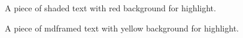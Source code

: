 \documentclass{beamer}
\begin{document}
\begin{frame}
  \begin{shaded}
    A piece of shaded text with red background for highlight.
  \end{shaded}

  \begin{mdframed}[backgroundcolor = yellow]
    A piece of mdframed text with yellow background for highlight.
  \end{mdframed}
\end{frame}
\end{document}
